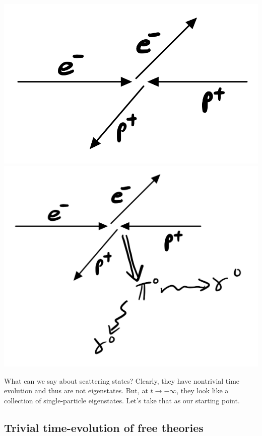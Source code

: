 \begin{center}
    \includegraphics[scale=0.3]{Lectures/Figures/lec16-elasticcollision.png}
    \includegraphics[scale=0.3]{Lectures/Figures/lec16-inelasticcollision.png}
\end{center}

What can we say about scattering states? Clearly, they have nontrivial time evolution and thus are not eigenstates. But, at $t \to -\infty$, they look like a collection of single-particle eigenstates. Let's take that as our starting point.

\subsection{Trivial time-evolution of free theories}

